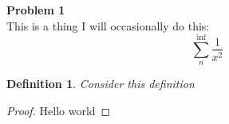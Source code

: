 \documentclass[11pt]{article}
\begin{document}
\textbf{Problem 1}\\
This is a thing I will occasionally do this:
$$\sum_{n}^{\inf}\frac{1}{x^{2}}$$
\newtheorem{definition}{Definition}[section]
\theoremstyle{definition}
\begin{definition}
Consider this definition
\end{definition}
\begin{proof}
Hello world
\end{proof}
\end{document}
